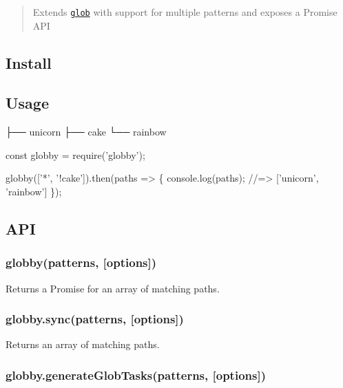 \begin{quote}
Extends \href{https://github.com/isaacs/node-glob}{\tt glob} with support for multiple patterns and exposes a Promise A\+PI \end{quote}


\subsection*{Install}




\subsection*{Usage}


\begin{DoxyCode}
├── unicorn
├── cake
└── rainbow
\end{DoxyCode}



\begin{DoxyCode}
const globby = require('globby');

globby(['*', '!cake']).then(paths => \{
    console.log(paths);
    //=> ['unicorn', 'rainbow']
\});
\end{DoxyCode}


\subsection*{A\+PI}

\subsubsection*{globby(patterns, \mbox{[}options\mbox{]})}

Returns a Promise for an array of matching paths.

\subsubsection*{globby.\+sync(patterns, \mbox{[}options\mbox{]})}

Returns an array of matching paths.

\subsubsection*{globby.\+generate\+Glob\+Tasks(patterns, \mbox{[}options\mbox{]})}

